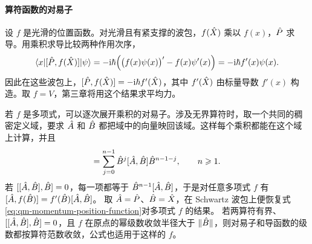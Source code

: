 \paragraph{算符函数的对易子}
设 $f$ 是光滑的位置函数。对光滑且有紧支撑的波包，$f(\hat{X})$ 乘以 $f(x)$，$\hat{P}$ 求导。用乘积求导比较两种作用次序，
\begin{equation}\label{eq:qm-momentum-position-function}
    \langle x\vert[\hat{P},f(\hat{X})]\vert\psi\rangle
    = -\mathrm{i}\hbar\Bigl(\bigl(f(x)\psi(x)\bigr)' - f(x)\psi'(x)\Bigr) = -\mathrm{i}\hbar f'(x)\psi(x).
\end{equation}
因此在这些波包上，$[\hat{P},f(\hat{X})] = -\mathrm{i}\hbar f'(\hat{X})$，其中 $f'(\hat{X})$ 由标量导数 $f'(x)$ 构造。取 $f = V$，第三章将用这个结果求平均力。

若 $f$ 是多项式，可以逐次展开乘积的对易子。涉及无界算符时，取一个共同的稠密定义域，要求 $\hat{A}$ 和 $\hat{B}$ 都把域中的向量映回该域。这样每个乘积都能在这个域上计算，并且
\begin{equation}
    [\op A,\op B^n]
    = \sum_{j=0}^{n-1}\op B^j[\op A,\op B]\op B^{n-1-j},\qquad n \geq 1 .
\end{equation}
若 $[[\hat{A},\hat{B}],\hat{B}] = 0$，每一项都等于 $\hat{B}^{n-1}[\hat{A},\hat{B}]$，于是对任意多项式 $f$ 有
$[\hat{A},f(\hat{B})] = f'(\hat{B})[\hat{A},\hat{B}]$。
取 $\hat{A} = \hat{P}$、$\hat{B} = \hat{X}$，在 Schwartz 波包上便恢复式\eqref{eq:qm-momentum-position-function}对多项式 $f$ 的结果。
若两算符有界、$[[\hat{A},\hat{B}],\hat{B}] = 0$，且 $f$ 在原点的幂级数收敛半径大于 $\|\hat{B}\|$，则对易子和导函数的级数都按算符范数收敛，公式也适用于这样的 $f$。

